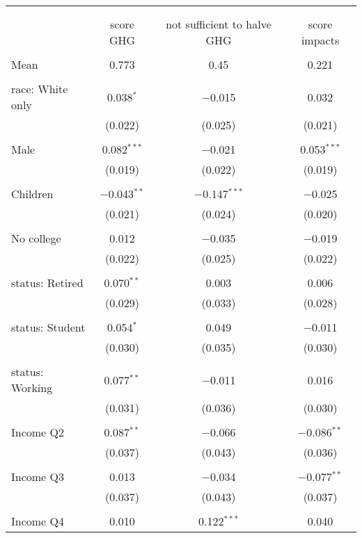 
\begin{tabular}{@{\extracolsep{5pt}}lccc} 
\\[-1.8ex]\hline 
\hline \\[-1.8ex] 
\\[-1.8ex] & score GHG & not sufficient to halve GHG & score impacts \\ 
\hline \\[-1.8ex] 
 Mean & 0.773 & 0.45 & 0.221  \\ \hline \\[-1.8ex] race: White only & 0.038$^{*}$ & $-$0.015 & 0.032 \\ 
  & (0.022) & (0.025) & (0.021) \\ 
  & & & \\ 
 Male & 0.082$^{***}$ & $-$0.021 & 0.053$^{***}$ \\ 
  & (0.019) & (0.022) & (0.019) \\ 
  & & & \\ 
 Children & $-$0.043$^{**}$ & $-$0.147$^{***}$ & $-$0.025 \\ 
  & (0.021) & (0.024) & (0.020) \\ 
  & & & \\ 
 No college & 0.012 & $-$0.035 & $-$0.019 \\ 
  & (0.022) & (0.025) & (0.022) \\ 
  & & & \\ 
 status: Retired & 0.070$^{**}$ & 0.003 & 0.006 \\ 
  & (0.029) & (0.033) & (0.028) \\ 
  & & & \\ 
 status: Student & 0.054$^{*}$ & 0.049 & $-$0.011 \\ 
  & (0.030) & (0.035) & (0.030) \\ 
  & & & \\ 
 status: Working & 0.077$^{**}$ & $-$0.011 & 0.016 \\ 
  & (0.031) & (0.036) & (0.030) \\ 
  & & & \\ 
 Income Q2 & 0.087$^{**}$ & $-$0.066 & $-$0.086$^{**}$ \\ 
  & (0.037) & (0.043) & (0.036) \\ 
  & & & \\ 
 Income Q3 & 0.013 & $-$0.034 & $-$0.077$^{**}$ \\ 
  & (0.037) & (0.043) & (0.037) \\ 
  & & & \\ 
 Income Q4 & 0.010 & 0.122$^{***}$ & 0.040 \\ 

\end{tabular}
